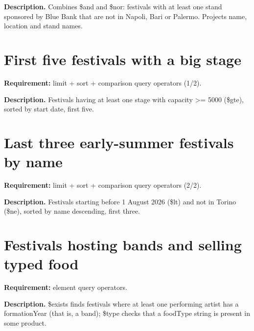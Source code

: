 \textbf{Description.} Combines \$and and \$nor: festivals with at least one stand sponsored by Blue Bank that are not in Napoli, Bari or Palermo. Projects name, location and stand names. 



\section{First five festivals with a big stage}
\textbf{Requirement:} limit + sort + comparison query operators (1/2).

\textbf{Description.} Festivals having at least one stage with capacity >= 5000 (\$gte), sorted by start date, first five. 



\section{Last three early-summer festivals by name}
\textbf{Requirement:} limit + sort + comparison query operators (2/2).

\textbf{Description.} Festivals starting before 1 August 2026 (\$lt) and not in Torino (\$ne), sorted by name descending, first three. 



\section{Festivals hosting bands and selling typed food}
\textbf{Requirement:} element query operators.

\textbf{Description.} \$exists finds festivals where at least one performing artist has a formationYear (that is, a band); \$type checks that a foodType string is present in some product. 


